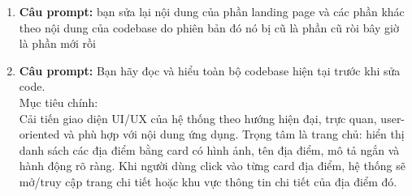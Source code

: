 \begin{enumerate}
Ghi chú cho bước sau nếu tôi muốn yêu cầu bạn implement plan này: \\
\* Thứ tự nên implement. \\
\* Những file nên chỉnh trước. \\
\* Những file nên tránh động vào. \\
\* Những phần cần backup hoặc review kỹ. \\
\* Những thay đổi nên làm thành từng commit nhỏ. \\
\* Những phần cần test sau mỗi phase. \\


Quy tắc quan trọng: \\
\* Bắt buộc đọc các Agent Skills, agent instructions, repository guidelines và tài liệu liên quan trước khi lập kế hoạch. \\
\* Bắt buộc đọc codebase trước khi đưa ra nhận xét. \\
\* Không áp đặt domain hoặc ý tưởng sản phẩm từ bên ngoài. \\
\* Không viết code implementation trong bước này. \\
\* Không sửa backend. \\
\* Không tự ý xoá file. \\
\* Không thay đổi API contract. \\
\* Không tự ý cài thêm package. \\
\* Không tự ý đổi architecture lớn. \\
\* Chỉ tạo file Markdown plan. \\
\* Khi nhắc đến file trong codebase, hãy ghi rõ đường dẫn file cụ thể. \\
\* Nếu chưa chắc chắn điều gì, ghi vào phần Assumptions hoặc Open Questions. \\
\* Plan phải đủ chi tiết để một developer khác có thể đọc file Markdown này và triển khai lại UI mobile mà không cần hỏi thêm quá nhiều. \\



\item \textbf{Câu prompt:} bạn sửa lại nội dung của phần landing page và các phần khác theo nội dung của codebase do phiên bản đó nó bị cũ là phần cũ ròi bây giờ là phần mới rồi \\


\item \textbf{Câu prompt:} Bạn hãy đọc và hiểu toàn bộ codebase hiện tại trước khi sửa code. \\

Mục tiêu chính: \\
Cải tiến giao diện UI/UX của hệ thống theo hướng hiện đại, trực quan, user-oriented và phù hợp với nội dung ứng dụng. Trọng tâm là trang chủ: hiển thị danh sách các địa điểm bằng card có hình ảnh, tên địa điểm, mô tả ngắn và hành động rõ ràng. Khi người dùng click vào từng card địa điểm, hệ thống sẽ mở/truy cập trang chi tiết hoặc khu vực thông tin chi tiết của địa điểm đó. \\


\end{enumerate}
